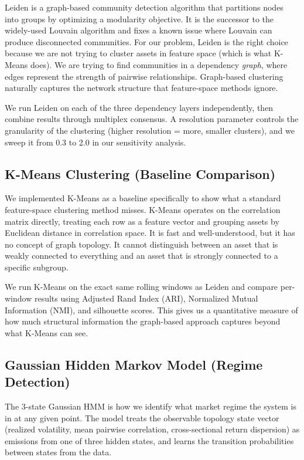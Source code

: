 \documentclass[12pt, letterpaper]{article}
\begin{document}
Leiden \cite{traag2019} is a graph-based community detection algorithm that partitions nodes into groups by optimizing a modularity objective. It is the successor to the widely-used Louvain algorithm and fixes a known issue where Louvain can produce disconnected communities. For our problem, Leiden is the right choice because we are not trying to cluster assets in feature space (which is what K-Means does). We are trying to find communities in a dependency \textit{graph}, where edges represent the strength of pairwise relationships. Graph-based clustering naturally captures the network structure that feature-space methods ignore.

We run Leiden on each of the three dependency layers independently, then combine results through multiplex consensus. A resolution parameter controls the granularity of the clustering (higher resolution = more, smaller clusters), and we sweep it from 0.3 to 2.0 in our sensitivity analysis.

\subsection{K-Means Clustering (Baseline Comparison)}

We implemented K-Means as a baseline specifically to show what a standard feature-space clustering method misses. K-Means operates on the correlation matrix directly, treating each row as a feature vector and grouping assets by Euclidean distance in correlation space. It is fast and well-understood, but it has no concept of graph topology. It cannot distinguish between an asset that is weakly connected to everything and an asset that is strongly connected to a specific subgroup.

We run K-Means on the exact same rolling windows as Leiden and compare per-window results using Adjusted Rand Index (ARI), Normalized Mutual Information (NMI), and silhouette scores. This gives us a quantitative measure of how much structural information the graph-based approach captures beyond what K-Means can see.

\subsection{Gaussian Hidden Markov Model (Regime Detection)}

The 3-state Gaussian HMM is how we identify what market regime the system is in at any given point. The model treats the observable topology state vector (realized volatility, mean pairwise correlation, cross-sectional return dispersion) as emissions from one of three hidden states, and learns the transition probabilities between states from the data.
\end{document}
